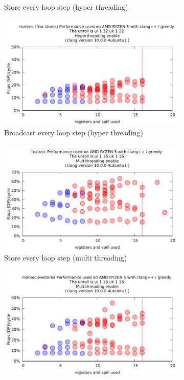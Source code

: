 \documentclass{article}
\begin{document}
\begin{figure}[h!]
\begin{subfigure}[h]{0.5\textwidth}
  \caption{Store every loop step (hyper threading)}
  \end{subfigure}
  \begin{subfigure}[h]{0.5\textwidth}  
  \includegraphics[width=\textwidth]{../autobench/datas/matvec_fewstores/threading/matvec_fewstores_ui_1_16_uk_1_16_hyper_threading.pdf}
  \caption{Broadcast every loop step (hyper threading)}
  \end{subfigure}
  \begin{subfigure}[h]{0.5\textwidth}  
  \includegraphics[width=\textwidth]{../autobench/datas/matvec/threading/matvec_ui_1_16_uk_1_16_multi_threading.pdf}
  \caption{Store every loop step (multi threading)}
  \end{subfigure}
  \begin{subfigure}[h]{0.5\textwidth}  
  \includegraphics[width=\textwidth]{../autobench/datas/matvec_fewstores/threading/matvec_fewstores_ui_1_16_uk_1_16_multi_threading.pdf}

\end{subfigure}
\end{figure}
\end{document}
